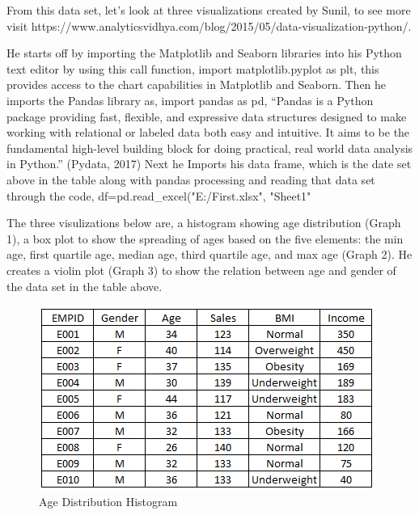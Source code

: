 \documentclass[sigconf]{acmart}
\begin{document}
From this data set, let’s look at three visualizations created by Sunil, to see more visit https://www.analyticsvidhya.com/blog/2015/05/data-visualization-python/.  

He starts off by importing the Matplotlib and Seaborn libraries into his Python text editor by using this call function, import matplotlib.pyplot as plt, this provides access to the chart capabilities in Matplotlib and Seaborn.
Then he imports the Pandas library as, import pandas as pd, “Pandas is a Python package providing fast, flexible, and expressive data structures designed to make working with relational or labeled data both easy and intuitive. It aims to be the fundamental high-level building block for doing practical, real world data analysis in Python.” (Pydata, 2017) 
Next he Imports his data frame, which is the date set above in the table along with pandas processing and reading that data set through the code, df=pd.read_excel("E:/First.xlsx", "Sheet1"

The three visulizations below are, a histogram showing age distribution (Graph 1), a box plot to show the spreading of ages based on the five elements: the min age, first quartile age, median age, third quartile age, and max age (Graph 2). He creates a violin plot (Graph 3) to show the relation between age and gender of the data set in the table above.

\begin{figure}[htb]
  \centering
  \includegraphics[width=1.0\columnwidth]{paper2/Table 1.png}
  \caption{Age Distribution Histogram
  \cite{Sunil Ray }}
  \label{fig:Graph 1} 
\end{figure}
\end{document}
